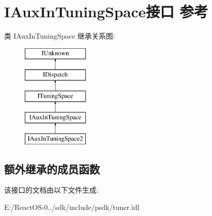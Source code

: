 \hypertarget{interface_i_aux_in_tuning_space}{}\section{I\+Aux\+In\+Tuning\+Space接口 参考}
\label{interface_i_aux_in_tuning_space}
类 I\+Aux\+In\+Tuning\+Space 继承关系图\+:\begin{figure}[H]
\begin{center}
\leavevmode
\includegraphics[height=5.000000cm]{interface_i_aux_in_tuning_space}
\end{center}
\end{figure}
\subsection*{额外继承的成员函数}


该接口的文档由以下文件生成\+:\begin{DoxyCompactItemize}
\item 
E\+:/\+React\+O\+S-\/0../sdk/include/psdk/tuner.\+idl\end{DoxyCompactItemize}
